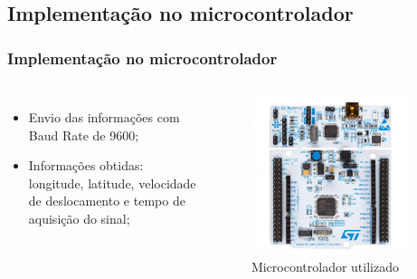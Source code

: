 \subsection{Implementação no microcontrolador}

\begin{frame}
\frametitle{Implementação no microcontrolador}
\begin{columns}

	\begin{itemize}
	\item Envio das informações com Baud Rate de 9600;
	\item Informações obtidas: longitude, latitude, velocidade de deslocamento e tempo de aquisição do sinal;
	\end{itemize}

	\begin{figure}[]
	 \centering
	 \captionsetup{width=0.9\textwidth,font=footnotesize,textfont=bf}
	 \includegraphics[width=0.9\textwidth,keepaspectratio]{Figuras/nucleo.jpg}
	 \vspace{-0.2cm}
	 \caption{Microcontrolador utilizado}
	\end{figure}
	
\end{columns}
\end{frame}

